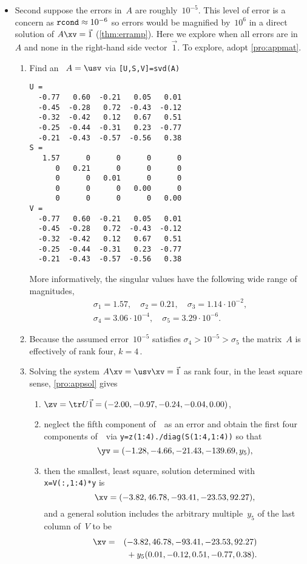 \begin{example}
\begin{solution}
\begin{itemize}
\item Second suppose the errors in~\(A\) are roughly~\(10^{-5}\).
This level of error is a concern as \(\verb|rcond|\approx10^{-6}\) so errors would be magnified by~\(10^6\) in a direct solution of \(A\xv=\vec1\) (\autoref{thm:erramp}).
Here we explore when all errors are in~\(A\) and none in the right-hand side vector~\(\vec 1\).
To explore, adopt \autoref{pro:appmat}.
\begin{enumerate}
\item Find an \svd\ \(A=\usv\) via \verb|[U,S,V]=svd(A)| \twodp
\begin{verbatim}
U =
  -0.77   0.60  -0.21   0.05   0.01
  -0.45  -0.28   0.72  -0.43  -0.12
  -0.32  -0.42   0.12   0.67   0.51
  -0.25  -0.44  -0.31   0.23  -0.77
  -0.21  -0.43  -0.57  -0.56   0.38
S =
   1.57      0      0      0      0
      0   0.21      0      0      0
      0      0   0.01      0      0
      0      0      0   0.00      0
      0      0      0      0   0.00
V =
  -0.77   0.60  -0.21   0.05   0.01
  -0.45  -0.28   0.72  -0.43  -0.12
  -0.32  -0.42   0.12   0.67   0.51
  -0.25  -0.44  -0.31   0.23  -0.77
  -0.21  -0.43  -0.57  -0.56   0.38
\end{verbatim}
More informatively, the singular values have the following wide range of magnitudes, 
\begin{eqnarray*}
&&\sigma_1=1.57,\quad
\sigma_2=0.21,\quad
\sigma_3=1.14\cdot10^{-2},\quad
\\&&
\sigma_4=3.06\cdot10^{-4},\quad
\sigma_5=3.29\cdot10^{-6}.
\end{eqnarray*}
\item Because the assumed error~\(10^{-5}\) satisfies \(\sigma_4>10^{-5}>\sigma_5\) the matrix~\(A\) is effectively of rank four, \(k=4\)\,.
\item Solving the system \(A\xv=\usv\xv=\vec1\) as rank four, in the least square sense, \autoref{pro:appsol} gives \twodp
\begin{enumerate}
\item \(\zv=\tr U\vec1=(-2.00,-0.97,-0.24,-0.04,0.00)\),
\item neglect the fifth component of~\zv\ as an error and obtain the first four components of~\yv\ via \verb|y=z(1:4)./diag(S(1:4,1:4))| so that
\begin{equation*}
\yv=(-1.28,-4.66,-21.43,-139.69,y_5),
\end{equation*}

\item then the smallest, least square, solution determined with 
\verb|x=V(:,1:4)*y| is
\begin{equation*}
\xv=(-3.82,46.78,-93.41,-23.53,92.27),
\end{equation*}
and a general solution includes the arbitrary multiple~\(y_5\) of the last column of~\(V\) to be
\begin{eqnarray*}
\xv&=&(-3.82,46.78,-93.41,-23.53,92.27)
\\&&{}+y_5(0.01,-0.12,0.51,-0.77,0.38).
\end{eqnarray*}
\end{enumerate}
\end{enumerate}


\end{itemize}
\end{solution}
\end{example}
